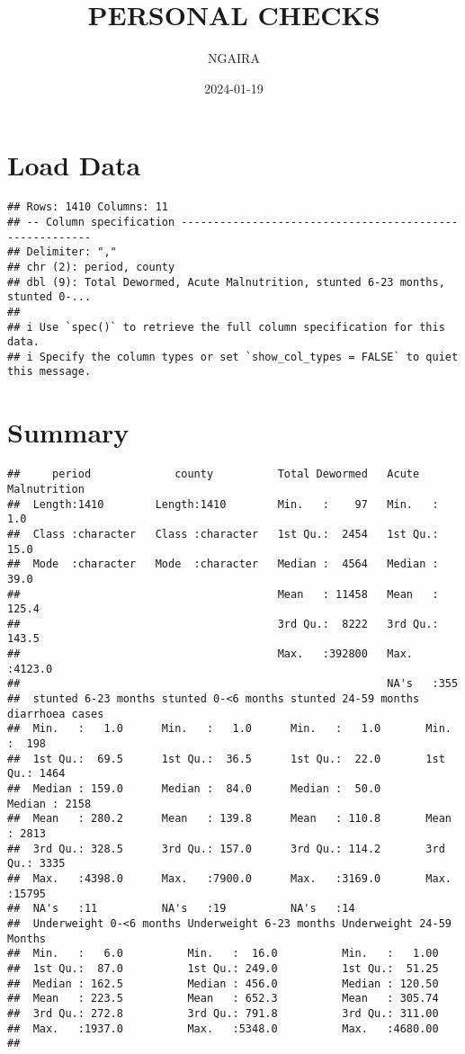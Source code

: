 \documentclass[
]{article}
\title{PERSONAL CHECKS}
\author{NGAIRA}
\date{2024-01-19}
\begin{document}
\maketitle

\hypertarget{load-data}{%
\section{Load Data}\label{load-data}}

\begin{verbatim}
## Rows: 1410 Columns: 11
## -- Column specification --------------------------------------------------------
## Delimiter: ","
## chr (2): period, county
## dbl (9): Total Dewormed, Acute Malnutrition, stunted 6-23 months, stunted 0-...
## 
## i Use `spec()` to retrieve the full column specification for this data.
## i Specify the column types or set `show_col_types = FALSE` to quiet this message.
\end{verbatim}

\hypertarget{summary}{%
\section{Summary}\label{summary}}

\begin{verbatim}
##     period             county          Total Dewormed   Acute Malnutrition
##  Length:1410        Length:1410        Min.   :    97   Min.   :   1.0    
##  Class :character   Class :character   1st Qu.:  2454   1st Qu.:  15.0    
##  Mode  :character   Mode  :character   Median :  4564   Median :  39.0    
##                                        Mean   : 11458   Mean   : 125.4    
##                                        3rd Qu.:  8222   3rd Qu.: 143.5    
##                                        Max.   :392800   Max.   :4123.0    
##                                                         NA's   :355       
##  stunted 6-23 months stunted 0-<6 months stunted 24-59 months diarrhoea cases
##  Min.   :   1.0      Min.   :   1.0      Min.   :   1.0       Min.   :  198  
##  1st Qu.:  69.5      1st Qu.:  36.5      1st Qu.:  22.0       1st Qu.: 1464  
##  Median : 159.0      Median :  84.0      Median :  50.0       Median : 2158  
##  Mean   : 280.2      Mean   : 139.8      Mean   : 110.8       Mean   : 2813  
##  3rd Qu.: 328.5      3rd Qu.: 157.0      3rd Qu.: 114.2       3rd Qu.: 3335  
##  Max.   :4398.0      Max.   :7900.0      Max.   :3169.0       Max.   :15795  
##  NA's   :11          NA's   :19          NA's   :14                          
##  Underweight 0-<6 months Underweight 6-23 months Underweight 24-59 Months
##  Min.   :   6.0          Min.   :  16.0          Min.   :   1.00         
##  1st Qu.:  87.0          1st Qu.: 249.0          1st Qu.:  51.25         
##  Median : 162.5          Median : 456.0          Median : 120.50         
##  Mean   : 223.5          Mean   : 652.3          Mean   : 305.74         
##  3rd Qu.: 272.8          3rd Qu.: 791.8          3rd Qu.: 311.00         
##  Max.   :1937.0          Max.   :5348.0          Max.   :4680.00         
## 
\end{verbatim}
\end{document}
